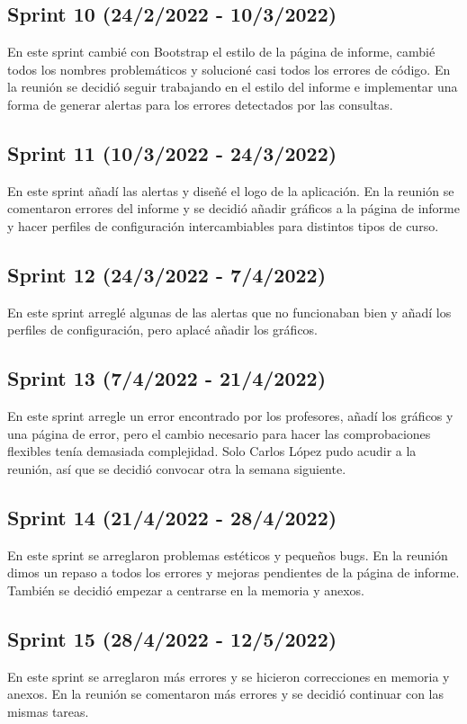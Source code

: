 \subsection{Sprint 10 (24/2/2022 - 10/3/2022)} 
	En este sprint cambié con Bootstrap el estilo de la página de informe, cambié todos los nombres problemáticos y solucioné casi todos los errores de código. En la reunión se decidió seguir trabajando en el estilo del informe e implementar una forma de generar alertas para los errores detectados por las consultas.
\subsection{Sprint 11 (10/3/2022 - 24/3/2022)} 
	En este sprint añadí las alertas y diseñé el logo de la aplicación. En la reunión se comentaron errores del informe y se decidió añadir gráficos a la página de informe y hacer perfiles de configuración intercambiables para distintos tipos de curso.
\subsection{Sprint 12 (24/3/2022 - 7/4/2022)} 
	En este sprint arreglé algunas de las alertas que no funcionaban bien y añadí los perfiles de configuración, pero aplacé añadir los gráficos.
\subsection{Sprint 13 (7/4/2022 - 21/4/2022)} 
	En este sprint arregle un error encontrado por los profesores, añadí los gráficos y una página de error, pero el cambio necesario para hacer las comprobaciones flexibles tenía demasiada complejidad. Solo Carlos López pudo acudir a la reunión, así que se decidió convocar otra la semana siguiente. 
\subsection{Sprint 14 (21/4/2022 - 28/4/2022)} 
	En este sprint se arreglaron problemas estéticos y pequeños bugs. En la reunión dimos un repaso a todos los errores y mejoras pendientes de la página de informe. También se decidió empezar a centrarse en la memoria y anexos.
\subsection{Sprint 15 (28/4/2022 - 12/5/2022)} 
	En este sprint se arreglaron más errores y se hicieron correcciones en memoria y anexos. En la reunión se comentaron más errores y se decidió continuar con las mismas tareas.
